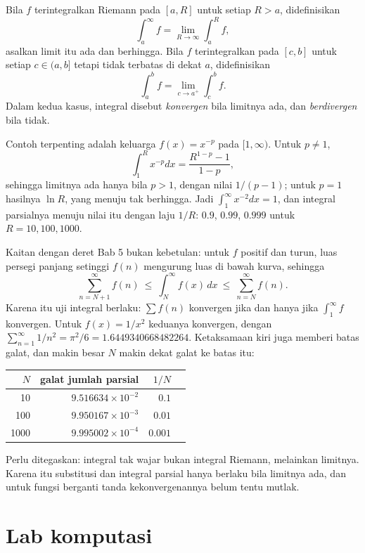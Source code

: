 \begin{definisi}
Bila $f$ terintegralkan Riemann pada $[a,R]$ untuk setiap $R>a$, didefinisikan
\[
\int_a^\infty f=\lim_{R\to\infty}\int_a^R f ,
\]
asalkan limit itu ada dan berhingga. Bila $f$ terintegralkan pada $[c,b]$ untuk setiap
$c\in(a,b]$ tetapi tidak terbatas di dekat $a$, didefinisikan
\[
\int_a^b f=\lim_{c\to a^{+}}\int_c^b f .
\]
Dalam kedua kasus, integral disebut \emph{konvergen} bila limitnya ada, dan
\emph{berdivergen} bila tidak.
\end{definisi}

Contoh terpenting adalah keluarga $f(x)=x^{-p}$ pada $[1,\infty)$. Untuk $p\ne1$,
\[
\int_1^R x^{-p}dx=\frac{R^{1-p}-1}{1-p},
\]
sehingga limitnya ada hanya bila $p>1$, dengan nilai $1/(p-1)$; untuk $p=1$ hasilnya
$\ln R$, yang menuju tak berhingga. Jadi $\int_1^\infty x^{-2}dx=1$, dan integral
parsialnya menuju nilai itu dengan laju $1/R$: $0.9$, $0.99$, $0.999$ untuk
$R=10,100,1000$.

Kaitan dengan deret Bab 5 bukan kebetulan: untuk $f$ positif dan turun, luas persegi
panjang setinggi $f(n)$ mengurung luas di bawah kurva, sehingga
\[
\sum_{n=N+1}^{\infty}f(n)\ \le\ \int_N^\infty f(x)\,dx\ \le\ \sum_{n=N}^{\infty}f(n) .
\]
Karena itu uji integral berlaku: $\sum f(n)$ konvergen jika dan hanya jika
$\int_1^\infty f$ konvergen. Untuk $f(x)=1/x^2$ keduanya konvergen, dengan
$\sum_{n=1}^{\infty}1/n^2=\pi^2/6=1.6449340668482264$. Ketaksamaan kiri juga memberi
batas galat, dan makin besar $N$ makin dekat galat ke batas itu:

\begin{center}\small
\begin{tabular}{rrrr}
\hline
$N$ & galat jumlah parsial & $1/N$ \\
\hline
10 & $9.516634\times10^{-2}$ & $0.1$ \\
100 & $9.950167\times10^{-3}$ & $0.01$ \\
1000 & $9.995002\times10^{-4}$ & $0.001$ \\
\hline
\end{tabular}
\end{center}

Perlu ditegaskan: integral tak wajar bukan integral Riemann, melainkan limitnya. Karena
itu substitusi dan integral parsial hanya berlaku bila limitnya ada, dan untuk fungsi
berganti tanda kekonvergenannya belum tentu mutlak.

\section{Lab komputasi}

